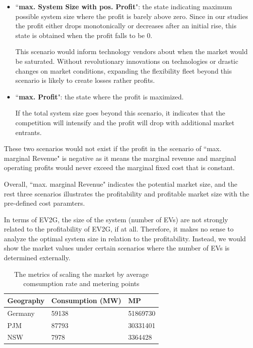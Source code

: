 \begin{itemize}
	\item ``\textbf{max. System Size with pos. Profit}": the state indicating maximum possible system size where the profit is barely above zero. Since in our studies the profit either drops monotonically or decreases after an initial rise, this state is obtained when the profit falls to be 0.
	
	This scenario would inform technology vendors about when the market would be saturated. Without revolutionary innovations on technologies or drastic changes on market conditions, expanding the flexibility fleet beyond this scenario is likely to create losses rather profits. 
	
	\item ``\textbf{max. Profit}": the state where the profit is maximized.
	
	If the total system size goes beyond this scenario, it indicates that the competition will intensify and the profit will drop with additional market entrants.
	
\end{itemize}

These two scenarios would not exist if the profit in the scenario of ``max. marginal Revenue" is negative as it means the marginal revenue and marginal operating profits would never exceed the marginal fixed cost that is constant. 

Overall, ``max. marginal Revenue" indicates the potential market size, and the rest three scenarios illustrates the profitability and profitable market size with the pre-defined cost paramters.

In terms of EV2G, the size of the system (number of EVs) are not strongly related to the profitability of EV2G, if at all. Therefore, it makes no sense to analyze the optimal system size in relation to the profitability. Instead, we would show the market values under certain scenarios where the number of EVs is determined externally. 

\begin{table}[h!]
	\centering
	\begin{tabular}{ L{2.5cm}  R{4cm}  R{3.5cm} }
		\hline
		\textbf{Geography} &\textbf{Consumption (MW)} & \textbf{MP} \\
		\hline
		Germany & \num{59138} & \num{51869730}\\
		PJM & \num{87793} & \num{30331401}\\
		NSW & \num{7978} & \num{3364428}\\
		\hline
	\end{tabular}
	\caption{The metrics of scaling the market by average comsumption rate and metering points}\label{tab:MP}
\end{table}

